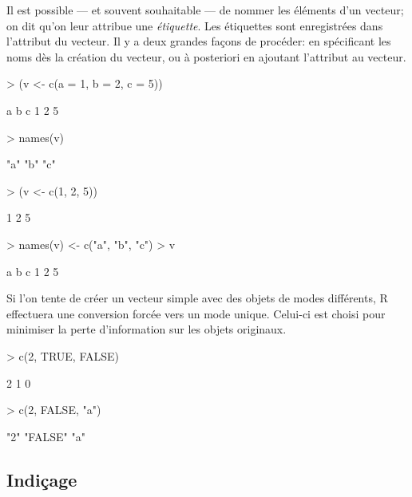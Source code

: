 Il est possible --- et souvent souhaitable --- de nommer les éléments
d'un vecteur; on dit qu'on leur attribue une \emph{étiquette}. Les
étiquettes sont enregistrées dans l'attribut  du
vecteur. Il y a deux grandes façons de procéder: en spécificant les
noms dès la création du vecteur, ou à posteriori en ajoutant
l'attribut au vecteur.
\begin{Schunk}
\begin{Sinput}
> (v <- c(a = 1, b = 2, c = 5))
\end{Sinput}
\begin{Soutput}
a b c
1 2 5
\end{Soutput}
\begin{Sinput}
> names(v)
\end{Sinput}
\begin{Soutput}
[1] "a" "b" "c"
\end{Soutput}
\end{Schunk}
\begin{Schunk}
\begin{Sinput}
> (v <- c(1, 2, 5))
\end{Sinput}
\begin{Soutput}
[1] 1 2 5
\end{Soutput}
\begin{Sinput}
> names(v) <- c("a", "b", "c")
> v
\end{Sinput}
\begin{Soutput}
a b c
1 2 5
\end{Soutput}
\end{Schunk}

Si l'on tente de créer un vecteur simple avec des objets de modes
différents, R effectuera une conversion
forcée vers un mode unique. Celui-ci est choisi pour
minimiser la perte d'information sur les objets originaux.
\begin{Schunk}
\begin{Sinput}
> c(2, TRUE, FALSE)
\end{Sinput}
\begin{Soutput}
[1] 2 1 0
\end{Soutput}
\begin{Sinput}
> c(2, FALSE, "a")
\end{Sinput}
\begin{Soutput}
[1] "2"     "FALSE" "a"
\end{Soutput}
\end{Schunk}


\subsection{Indiçage}
\label{sec:premiers:vecteurs:indicage}

